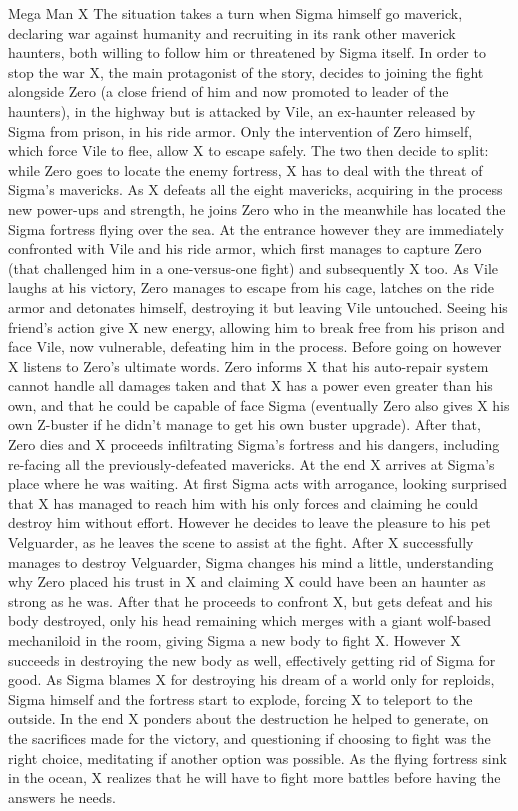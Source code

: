 \documentclass[openany]{report}
\begin{document}
\begin{chapter}{Mega Man X}
	The situation takes a turn when Sigma himself go maverick, declaring war against humanity and recruiting in its rank other maverick haunters, both willing to follow him or threatened by Sigma itself. In order to stop the war X, the main protagonist of the story, decides to joining the fight alongside Zero (a close friend of him and now promoted to leader of the haunters), in the highway but is attacked by Vile, an ex-haunter released by Sigma from prison, in his ride armor. Only the intervention of Zero himself, which force Vile to flee, allow X to escape safely. The two then decide to split: while Zero goes to locate the enemy fortress, X has to deal with the threat of Sigma's mavericks. As X defeats all the eight mavericks, acquiring in the process new power-ups and strength, he joins Zero who in the meanwhile has located the Sigma fortress flying over the sea. At the entrance however they are immediately confronted with Vile and his ride armor, which first manages to capture Zero (that challenged him in a one-versus-one fight) and subsequently X too. As Vile laughs at his victory, Zero manages to escape from his cage, latches on the ride armor and detonates himself, destroying it but leaving Vile untouched. Seeing his friend's action give X new energy, allowing him to break free from his prison and face Vile, now vulnerable, defeating him in the process. Before going on however X listens to Zero's ultimate words\cite{wiki:MMX_script}. Zero informs X that his auto-repair system cannot handle all damages taken and that X has a power even greater than his own, and that he could be capable of face Sigma (eventually Zero also gives X his own Z-buster if he didn't manage to get his own buster upgrade). After that, Zero dies and X proceeds infiltrating Sigma's fortress and his dangers, including re-facing all the previously-defeated mavericks. At the end X arrives at Sigma's place where he was waiting. At first Sigma acts with arrogance, looking surprised that X has managed to reach him with his only forces and claiming he could destroy him without effort. However he decides to leave the pleasure to his pet Velguarder, as he leaves the scene to assist at the fight. After X successfully manages to destroy Velguarder, Sigma changes his mind a little, understanding why Zero placed his trust in X and claiming X could have been an haunter as strong as he was. After that he proceeds to confront X, but gets defeat and his body destroyed, only his head remaining which merges with a giant wolf-based mechaniloid in the room, giving Sigma a new body to fight X. However X succeeds in destroying the new body as well, effectively getting rid of Sigma for good. As Sigma blames X for destroying his dream of a world only for reploids, Sigma himself and the fortress start to explode, forcing X to teleport to the outside. In the end X ponders about the destruction he helped to generate, on the sacrifices made for the victory, and questioning if choosing to fight was the right choice, meditating if another option was possible. As the flying fortress sink in the ocean, X realizes that he will have to fight more battles before having the answers he needs. 

\end{chapter}
\end{document}
